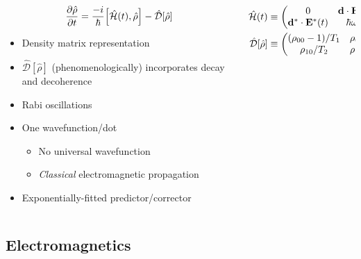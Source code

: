 \documentclass[aspectratio=169]{beamer}
\begin{document}
\begin{frame}
  \begin{columns}
    \begin{column}{0.5\textwidth}
        \begin{equation*}
          \pdv{\hat{\rho}}{t} = \frac{-i}{\hbar} \commutator{\hat{\mathcal{H}}(t)}{\hat{\rho}} - \hat{\mathcal{D}}\qty[\hat{\rho}]
        \end{equation*}
        \begin{itemize}
          \item Density matrix representation %
          \item $\hat{\mathcal{D}}[\hat{\rho}]$ (phenomenologically) incorporates decay and decoherence
          \item Rabi oscillations
          \item One wavefunction/dot
            \begin{itemize}
              \item No universal wavefunction
              \item \emph{Classical} electromagnetic propagation
            \end{itemize}
          \item Exponentially-fitted predictor/corrector
        \end{itemize}
    \end{column}
    \begin{column}{0.5\textwidth}
      
      \begin{align*}
        \hat{\mathcal{H}}(t) &\equiv \mqty(0 & \vb{d} \cdot \vb{E}(t) \\ \vb{d}^* \cdot \vb{E}^*(t) & \hbar \omega_0) \\
        \hat{\mathcal{D}}[\hat{\rho}] &\equiv \mqty( (\rho_{00} - 1)/T_1 & \rho_{01}/T_2 \\ \rho_{10}/T_2 & \rho_{11}/T_1)
      \end{align*}
    \end{column}
  \end{columns}
\end{frame}

\subsection{Electromagnetics}
\end{document}
